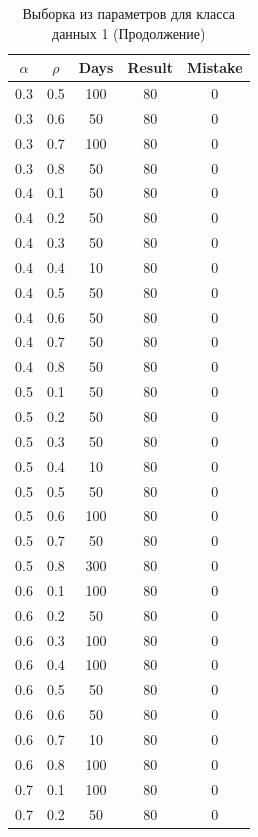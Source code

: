\begin{center}
	\captionsetup{justification=raggedright,singlelinecheck=off}
	\begin{longtable}[c]{|c|c|c|c|c|}
		\caption{Выборка из параметров для класса данных 1 (Продолжение)\label{tbl:table_kd1-2}}\\ \hline
		$\alpha$ & $\rho$ & Days & Result & Mistake \\ \hline
		0.3 & 0.5 &  100 &   80 &    0 \\
		0.3 & 0.6 &  50 &   80 &    0 \\
		0.3 & 0.7 &  100 &   80 &    0 \\
		0.3 & 0.8 &  50 &  80 &    0 \\ \hline
		0.4 & 0.1 &  50 &   80 &    0 \\
		0.4 & 0.2 &  50 &   80 &    0 \\
		0.4 & 0.3 &  50 &   80 &    0 \\
		0.4 & 0.4 &  10 &   80 &    0 \\
		0.4 & 0.5 &  50 &   80 &    0 \\
		0.4 & 0.6 &  50 &   80 &    0 \\
		0.4 & 0.7 &  50 &   80 &    0 \\	
		0.4 & 0.8 &  50 &  80 &    0 \\ \hline
		0.5 & 0.1 &  50 &   80 &    0 \\
		0.5 & 0.2 &  50 &   80 &    0 \\
		0.5 & 0.3 &  50 &   80 &    0 \\
		0.5 & 0.4 &  10 &   80 &    0 \\
		0.5 & 0.5 &  50 &   80 &    0 \\
		0.5 & 0.6 &  100 &   80 &    0 \\
		0.5 & 0.7 &  50 &   80 &    0 \\
		0.5 & 0.8 &  300 &  80 &    0 \\ \hline
		0.6 & 0.1 & 100 &   80 &    0 \\
		0.6 & 0.2 & 50 &   80 &    0 \\
		0.6 & 0.3 & 100 &   80 &    0 \\
		0.6 & 0.4 & 100 &   80 &    0 \\
		0.6 & 0.5 & 50 &   80 &    0 \\
		0.6 & 0.6 & 50 &   80 &    0 \\
		0.6 & 0.7 & 10 &   80 &    0 \\
		0.6 & 0.8 & 100 &  80 &    0 \\ \hline
		0.7 & 0.1 & 100 &   80 &    0 \\
		0.7 & 0.2 & 50 &   80 &    0 \\ \hline
	\end{longtable}
\end{center}

